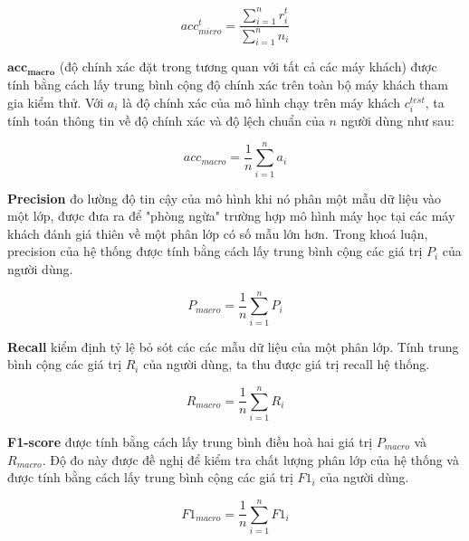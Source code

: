 \begin{equation}
    acc_{micro}^t = \frac{\sum_{i=1}^{n} r_i^t}{\sum_{i=1}^{n} n_i}
\end{equation}

$\mathbf{acc_{macro}}$ (độ chính xác đặt trong tương quan với tất cả các máy khách) được tính bằng cách lấy trung bình cộng độ chính xác trên toàn bộ máy khách tham gia kiểm thử. Với $a_i$ là độ chính xác của mô hình chạy trên máy khách $c_i^{test}$, ta tính toán thông tin về độ chính xác và độ lệch chuẩn của $n$ người dùng như sau:

\begin{equation}
    acc_{macro} = \frac{1}{n} \sum_{i=1}^n a_i
\end{equation}


\textbf{Precision} đo lường độ tin cậy của mô hình khi nó phân một mẫu dữ liệu vào một lớp, được đưa ra để "phòng ngừa" trường hợp mô hình máy học tại các máy khách đánh giá thiên về một phân lớp có số mẫu lớn hơn. Trong khoá luận, precision của hệ thống được tính bằng cách lấy trung bình cộng các giá trị $P_i$ của người dùng.

\begin{equation}
    P_{macro} = \frac{1}{n} \sum_{i=1}^n P_i
\end{equation}

\textbf{Recall} kiểm định tỷ lệ bỏ sót các các mẫu dữ liệu của một phân lớp. Tính trung bình cộng các giá trị $R_i$ của người dùng, ta thu được giá trị recall hệ thống.

\begin{equation}
    R_{macro} = \frac{1}{n} \sum_{i=1}^n R_i
\end{equation}

\textbf{F1-score} được tính bằng cách lấy trung bình điều hoà hai giá trị $P_{macro}$ và $R_{macro}$. Độ đo này được đề nghị để kiểm tra chất lượng phân lớp của hệ thống và được tính bằng cách lấy trung bình cộng các giá trị $F1_{i}$ của người dùng.

\begin{equation}
    F1_{macro} = \frac{1}{n} \sum_{i=1}^n F1_i
\end{equation}

